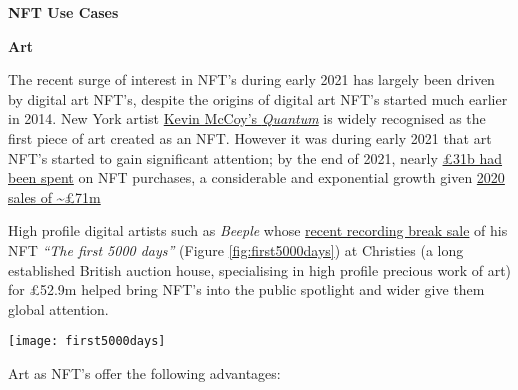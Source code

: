 \textbf{NFT Use Cases}

\textbf{Art}

The recent surge of interest in NFT's during early 2021 has largely been
driven by digital art NFT's, despite the origins of digital art NFT's
started much earlier in 2014. New York artist
\href{https://www.mccoyspace.com/project/125/}{Kevin McCoy's
\emph{Quantum}} is widely recognised as the first piece of art created
as an NFT. However it was during early 2021 that art NFT's started to
gain significant attention; by the end of 2021, nearly
\href{https://www.paymentscardsandmobile.com/state-of-the-blockchain-nfts-explode-onto-scene-in-2021/}{£31b
had been spent} on NFT purchases, a considerable and exponential growth
given
\href{https://raritysniper.com/news/nfts-exploded-in-2021-with-25-billion-in-sales/}{2020
sales of \textasciitilde£71m}

High profile digital artists such as \emph{Beeple} whose
\href{https://www.forbes.com/sites/abrambrown/2021/03/11/beeple-art-sells-for-693-million-becoming-most-expensive-nft-ever/?sh=3f237d1c2448}{recent
recording break sale} of his NFT \emph{``The first 5000 days''} (Figure \ref{fig:first5000days}) at Christies (a long established British auction house,
specialising in high profile precious work of art) for £52.9m helped
bring NFT's into the public spotlight and wider give them global
attention.

\begin{figure*}[ht]\centering %
	\texttt{[image: first5000days]}
	\caption{Beeple: First 5000 days, \href{https://onlineonly.christies.com/s/beeple-first-5000-days/lots/2020}{taken from the Christies website, assumed fair use}.}
	\label{fig:first5000days}
\end{figure*}

Art as NFT's offer the following advantages:

